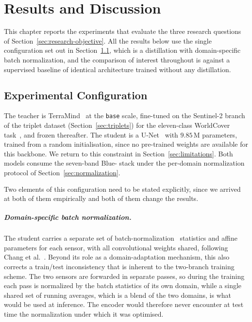 \chapter{Results and Discussion}
\label{chap:results-discussion}

This chapter reports the experiments that evaluate the three research questions of Section~\ref{sec:research-objective}.
All the results below use the single configuration set out in Section~\ref{sec:configuration}, which is a distillation with domain-specific batch normalization, and the comparison of interest throughout is against a supervised baseline of identical architecture trained without any distillation.

\section{Experimental Configuration}
\label{sec:configuration}

The teacher is TerraMind~\cite{jakubik2025terramind} at the \texttt{base} scale, fine-tuned on the Sentinel-2 branch of the triplet dataset (Section~\ref{sec:triplets}) for the eleven-class WorldCover  task~\cite{zanaga2022worldcover}, and frozen thereafter.
The student is a U-Net~\cite{ronneberger2015unet} with $9.85$\,M parameters, trained from a random initialisation, since no pre-trained weights are available for this backbone.
We return to this constraint in Section~\ref{sec:limitations}.
Both models consume the seven-band Blue- stack under the per-domain normalization protocol of Section~\ref{sec:normalization}.

Two elements of this configuration need to be stated explicitly, since we arrived at both of them empirically and both of them change the results.

\paragraph{Domain-specific batch normalization.}
The student carries a separate set of batch-normalization~\cite{ioffe2015batchnorm} statistics and affine parameters for each sensor, with all convolutional weights shared, following Chang et al.~\cite{chang2019dsbn}.
Beyond its role as a domain-adaptation mechanism, this also corrects a train/test inconsistency that is inherent to the two-branch training scheme.
The two sensors are forwarded in separate passes, so during the training each pass is normalized by the batch statistics of its own domain, while a single shared set of running averages, which is a blend of the two domains, is what would be used at inference.
The encoder would therefore never encounter at test time the normalization under which it was optimised.

